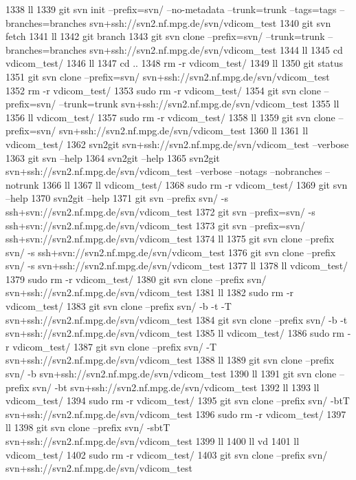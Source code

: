  1338  ll
 1339  git svn init --prefix=svn/ --no-metadata --trunk=trunk --tags=tags --branches=branches svn+ssh://svn2.nf.mpg.de/svn/vdicom_test
 1340  git svn fetch
 1341  ll
 1342  git branch
 1343  git svn clone --prefix=svn/ --trunk=trunk --branches=branches svn+ssh://svn2.nf.mpg.de/svn/vdicom_test
 1344  ll
 1345  cd vdicom_test/
 1346  ll
 1347  cd ..
 1348  rm -r vdicom_test/
 1349  ll
 1350  git status
 1351  git svn clone --prefix=svn/ svn+ssh://svn2.nf.mpg.de/svn/vdicom_test
 1352  rm -r vdicom_test/
 1353  sudo rm -r vdicom_test/
 1354  git svn clone --prefix=svn/ --trunk=trunk svn+ssh://svn2.nf.mpg.de/svn/vdicom_test
 1355  ll
 1356  ll vdicom_test/
 1357  sudo rm -r vdicom_test/
 1358  ll
 1359  git svn clone --prefix=svn/ svn+ssh://svn2.nf.mpg.de/svn/vdicom_test
 1360  ll
 1361  ll vdicom_test/
 1362  svn2git svn+ssh://svn2.nf.mpg.de/svn/vdicom_test --verbose
 1363  git svn --help
 1364  svn2git --help
 1365  svn2git svn+ssh://svn2.nf.mpg.de/svn/vdicom_test --verbose --notags --nobranches --notrunk
 1366  ll
 1367  ll vdicom_test/
 1368  sudo rm -r vdicom_test/
 1369  git svn --help
 1370  svn2git --help
 1371  git svn --prefix svn/ -s ssh+svn://svn2.nf.mpg.de/svn/vdicom_test 
 1372  git svn --prefix=svn/ -s ssh+svn://svn2.nf.mpg.de/svn/vdicom_test 
 1373  git svn --prefix=svn/ ssh+svn://svn2.nf.mpg.de/svn/vdicom_test 
 1374  ll
 1375  git svn clone --prefix svn/ -s ssh+svn://svn2.nf.mpg.de/svn/vdicom_test 
 1376  git svn clone --prefix svn/ -s svn+ssh://svn2.nf.mpg.de/svn/vdicom_test 
 1377  ll
 1378  ll vdicom_test/
 1379  sudo rm -r vdicom_test/
 1380  git svn clone --prefix svn/ svn+ssh://svn2.nf.mpg.de/svn/vdicom_test 
 1381  ll
 1382  sudo rm -r vdicom_test/
 1383  git svn clone --prefix svn/ -b -t -T svn+ssh://svn2.nf.mpg.de/svn/vdicom_test 
 1384  git svn clone --prefix svn/ -b -t svn+ssh://svn2.nf.mpg.de/svn/vdicom_test 
 1385  ll vdicom_test/
 1386  sudo rm -r vdicom_test/
 1387  git svn clone --prefix svn/ -T svn+ssh://svn2.nf.mpg.de/svn/vdicom_test 
 1388  ll
 1389  git svn clone --prefix svn/ -b svn+ssh://svn2.nf.mpg.de/svn/vdicom_test 
 1390  ll
 1391  git svn clone --prefix svn/ -bt svn+ssh://svn2.nf.mpg.de/svn/vdicom_test 
 1392  ll
 1393  ll vdicom_test/
 1394  sudo rm -r vdicom_test/
 1395  git svn clone --prefix svn/ -btT svn+ssh://svn2.nf.mpg.de/svn/vdicom_test 
 1396  sudo rm -r vdicom_test/
 1397  ll
 1398  git svn clone --prefix svn/ -sbtT svn+ssh://svn2.nf.mpg.de/svn/vdicom_test 
 1399  ll
 1400  ll vd
 1401  ll vdicom_test/
 1402  sudo rm -r vdicom_test/
 1403  git svn clone --prefix svn/ svn+ssh://svn2.nf.mpg.de/svn/vdicom_test 
